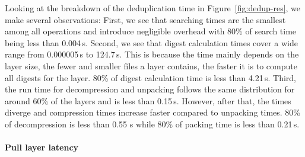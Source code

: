 %
Looking at the breakdown of the deduplication time in Figure~\ref{fig:dedup-res},
we make several observations:
%
First, we see that searching times are the smallest among all operations
and introduce negligible overhead with 80\% of search  time being less than
0.004\,s. 
%
%
%
Second, we see that digest calculation times cover a wide range
from 0.000005\,s to 124.7\,s.
%
This is because the time mainly depends on the layer size, \ie the fewer and smaller
files a layer contains, the faster it is to compute all digests for the layer.
%
%
%
80\% of digest calculation time is less than 4.21\,s. 
%
%
%
Third, the run time for decompression and unpacking follows the same distribution
for around 60\% of the layers and is less than 0.15\,s.
%
%
However, after that, the times diverge and compression times increase faster compared
to unpacking times.
%
80\% of decompression is less than 0.55 s while 80\% of packing time is less than 0.21\,s.


\paragraph{Pull layer latency} 

